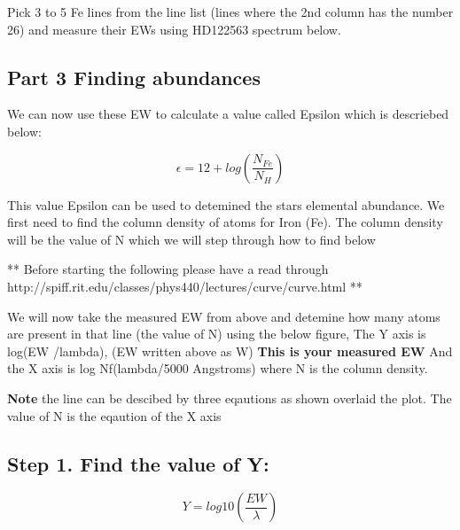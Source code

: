 \documentclass[11pt]{article}
\begin{document}
    Pick 3 to 5 Fe lines from the line list (lines where the 2nd column has
the number 26) and measure their EWs using HD122563 spectrum below.

    \subsection{Part 3 Finding abundances}\label{part-3-finding-abundances}

We can now use these EW to calculate a value called Epsilon which is
descriebed below:

\begin{equation*}
\epsilon = 12 + log\left(\frac{N_{Fe}}{N_H}\right)
\end{equation*}

This value Epsilon can be used to detemined the stars elemental
abundance. We first need to find the column density of atoms for Iron
(Fe). The column density will be the value of N which we will step
through how to find below

** Before starting the following please have a read through
http://spiff.rit.edu/classes/phys440/lectures/curve/curve.html **

    We will now take the measured EW from above and detemine how many atoms
are present in that line (the value of N) using the below figure, The Y
axis is log(EW /lambda), (EW written above as W) \textbf{This is your
measured EW} And the X axis is log Nf(lambda/5000 Angstroms) where N is
the column density.

\textbf{Note} the line can be descibed by three eqautions as shown
overlaid the plot. The value of N is the eqaution of the X axis

    

    \subsection{Step 1. Find the value of
Y:}\label{step-1.-find-the-value-of-y}

\begin{equation*}
Y = log10(\frac{EW}{\lambda})
\end{equation*}
\end{document}
